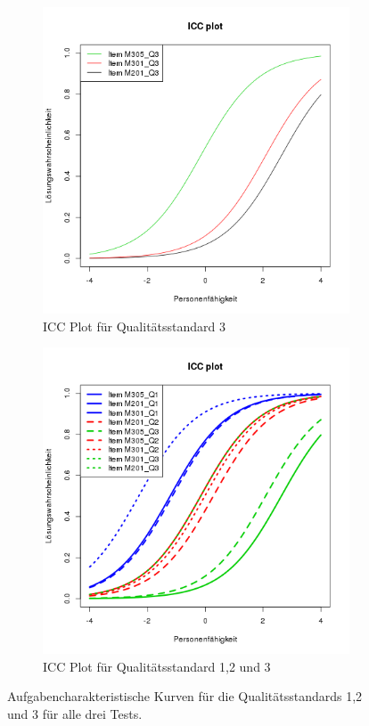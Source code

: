  \begin{figure}[htbp]
 \ContinuedFloat %
 \centering
 \begin{subfigure}{0.49\textwidth}
   \includegraphics[width=1.0\linewidth]{graphics/ICCQ3.png}
   \caption{ICC Plot für Qualitätsstandard 3}
   \label{fig:ICCQ3}
 \end{subfigure}
 \begin{subfigure}{0.49\textwidth}
   \includegraphics[width=1.0\linewidth]{graphics/ICCQ123.png}
   \caption{ICC Plot für Qualitätsstandard 1,2 und 3}
   \label{fig:ICCQ123}
 \end{subfigure}
 
 \caption{Aufgabencharakteristische Kurven für die Qualitätsstandards 1,2 und 3 für alle drei Tests.}
 \label{fig:corLevRasch}
 \end{figure}
 
